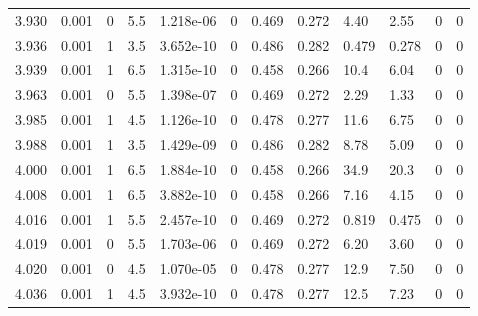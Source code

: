 \documentclass[preview]{standalone}
\begin{document}
{{{{{{{\begin{tabular}{L{1.2cm}C{1.2cm} C{0.3cm}C{0.5cm} C{1.4cm}C{1.4cm} C{1.4cm}C{1.4cm} C{1.6cm}C{1.6cm} C{1.6cm}C{1.6cm}}
  3.930  &  0.001  & 0     & 5.5 &  1.218e-06  & 0  &  0.469&   0.272& 4.40 & 2.55   &  0 & 0  \\ 
  3.936  &  0.001  & 1     & 3.5 &  3.652e-10  & 0  &  0.486&   0.282& 0.479 & 0.278   &  0 & 0  \\ 
  3.939  &  0.001  & 1     & 6.5 &  1.315e-10  & 0  &  0.458&   0.266& 10.4 & 6.04   &  0 & 0  \\ 
  3.963  &  0.001  & 0     & 5.5 &  1.398e-07  & 0  &  0.469&   0.272& 2.29 & 1.33   &  0 & 0  \\ 
  3.985  &  0.001  & 1     & 4.5 &  1.126e-10  & 0  &  0.478&   0.277& 11.6 & 6.75   &  0 & 0  \\ 
  3.988  &  0.001  & 1     & 3.5 &  1.429e-09  & 0  &  0.486&   0.282& 8.78 & 5.09   &  0 & 0  \\ 
  4.000  &  0.001  & 1     & 6.5 &  1.884e-10  & 0  &  0.458&   0.266& 34.9 & 20.3   &  0 & 0  \\ 
  4.008  &  0.001  & 1     & 6.5 &  3.882e-10  & 0  &  0.458&   0.266& 7.16 & 4.15   &  0 & 0  \\ 
  4.016  &  0.001  & 1     & 5.5 &  2.457e-10  & 0  &  0.469&   0.272& 0.819 & 0.475   &  0 & 0  \\ 
  4.019  &  0.001  & 0     & 5.5 &  1.703e-06  & 0  &  0.469&   0.272& 6.20 & 3.60   &  0 & 0  \\ 
  4.020  &  0.001  & 0     & 4.5 &  1.070e-05  & 0  &  0.478&   0.277& 12.9 & 7.50   &  0 & 0  \\ 
  4.036  &  0.001  & 1     & 4.5 &  3.932e-10  & 0  &  0.478&   0.277& 12.5 & 7.23   &  0 & 0  \\ 
\hline 
\end{tabular} 

}}}}}}}
\end{document}
